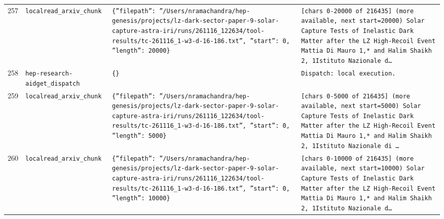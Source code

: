 \documentclass[11pt,a4paper]{article}
\begin{document}
\begin{longtable}{@{}p{}p{}p{}p{}@{}}
257 & \texttt{local}\newline\texttt{read\_\allowbreak{}arxiv\_\allowbreak{}chunk} & \texttt{\{''filepath'':\allowbreak{} ''/\allowbreak{}Users/\allowbreak{}nramachandra/\allowbreak{}hep-genesis/\allowbreak{}projects/\allowbreak{}lz-dark-sector-paper-9-solar-capture-astra-iri/\allowbreak{}runs/\allowbreak{}261116\_\allowbreak{}122634/\allowbreak{}tool-results/\allowbreak{}tc-261116\_\allowbreak{}1-w3-d-16-186.txt'',\allowbreak{} ''start'':\allowbreak{} 0,\allowbreak{} ''length'':\allowbreak{} 20000\}\allowbreak{}} & \texttt{[chars 0-20000 of 216435]\allowbreak{} (more available,\allowbreak{} next start=\allowbreak{}20000)\allowbreak{}  Solar Capture Tests of Inelastic Dark Matter after the LZ High-Recoil Event Mattia Di Mauro 1,\allowbreak{}* and Halim Shaikh 2,\allowbreak{}\dag{}\allowbreak{} 1Istituto Nazionale d\ldots{}\allowbreak{}} \\
258 & \texttt{hep-research-aid}\newline\texttt{get\_\allowbreak{}dispatch} & \texttt{\{\}\allowbreak{}} & \texttt{Dispatch:\allowbreak{} local execution.} \\
259 & \texttt{local}\newline\texttt{read\_\allowbreak{}arxiv\_\allowbreak{}chunk} & \texttt{\{''filepath'':\allowbreak{} ''/\allowbreak{}Users/\allowbreak{}nramachandra/\allowbreak{}hep-genesis/\allowbreak{}projects/\allowbreak{}lz-dark-sector-paper-9-solar-capture-astra-iri/\allowbreak{}runs/\allowbreak{}261116\_\allowbreak{}122634/\allowbreak{}tool-results/\allowbreak{}tc-261116\_\allowbreak{}1-w3-d-16-186.txt'',\allowbreak{} ''start'':\allowbreak{} 0,\allowbreak{} ''length'':\allowbreak{} 5000\}\allowbreak{}} & \texttt{[chars 0-5000 of 216435]\allowbreak{} (more available,\allowbreak{} next start=\allowbreak{}5000)\allowbreak{}  Solar Capture Tests of Inelastic Dark Matter after the LZ High-Recoil Event Mattia Di Mauro 1,\allowbreak{}* and Halim Shaikh 2,\allowbreak{}\dag{}\allowbreak{} 1Istituto Nazionale di \ldots{}\allowbreak{}} \\
260 & \texttt{local}\newline\texttt{read\_\allowbreak{}arxiv\_\allowbreak{}chunk} & \texttt{\{''filepath'':\allowbreak{} ''/\allowbreak{}Users/\allowbreak{}nramachandra/\allowbreak{}hep-genesis/\allowbreak{}projects/\allowbreak{}lz-dark-sector-paper-9-solar-capture-astra-iri/\allowbreak{}runs/\allowbreak{}261116\_\allowbreak{}122634/\allowbreak{}tool-results/\allowbreak{}tc-261116\_\allowbreak{}1-w3-d-16-186.txt'',\allowbreak{} ''start'':\allowbreak{} 0,\allowbreak{} ''length'':\allowbreak{} 10000\}\allowbreak{}} & \texttt{[chars 0-10000 of 216435]\allowbreak{} (more available,\allowbreak{} next start=\allowbreak{}10000)\allowbreak{}  Solar Capture Tests of Inelastic Dark Matter after the LZ High-Recoil Event Mattia Di Mauro 1,\allowbreak{}* and Halim Shaikh 2,\allowbreak{}\dag{}\allowbreak{} 1Istituto Nazionale d\ldots{}\allowbreak{}} \\

\end{longtable}
\end{document}
